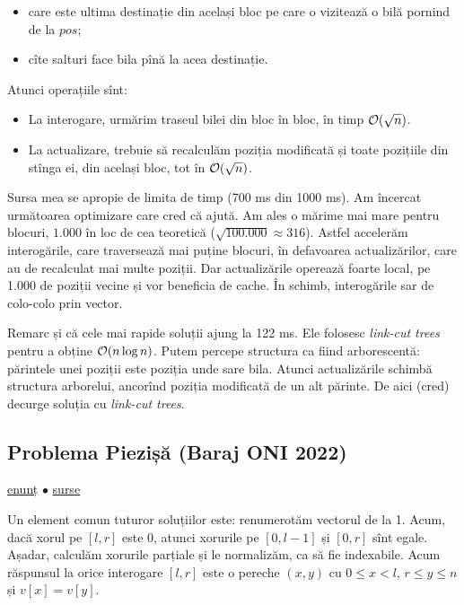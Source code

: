 \documentclass[../main.tex]{subfiles}
\begin{document}
\begin{itemize}
  \item care este ultima destinație din același bloc pe care o vizitează o bilă pornind de la $pos$;
  \item cîte salturi face bila pînă la acea destinație.
\end{itemize}

Atunci operațiile sînt:

\begin{itemize}
  \item La interogare, urmărim traseul bilei din bloc în bloc, în timp $\mathcal{O}(\sqrt{n})$.

  \item La actualizare, trebuie să recalculăm poziția modificată și toate pozițiile din stînga ei, din același bloc, tot în $\mathcal{O}(\sqrt{n})$.
\end{itemize}

Sursa mea se apropie de limita de timp (700 ms din 1000 ms). Am încercat următoarea optimizare care cred că ajută. Am ales o mărime mai mare pentru blocuri, $1.000$ în loc de cea teoretică ($\sqrt{100.000} \approx 316$). Astfel accelerăm interogările, care traversează mai puține blocuri, în defavoarea actualizărilor, care au de recalculat mai multe poziții. Dar actualizările operează foarte local, pe 1.000 de poziții vecine și vor beneficia de cache. În schimb, interogările sar de colo-colo prin vector.

Remarc și că cele mai rapide soluții ajung la 122 ms. Ele folosesc \textit{link-cut trees} pentru a obține $\mathcal{O}(n \log n)$. Putem percepe structura ca fiind arborescentă: părintele unei poziții este poziția unde sare bila. Atunci actualizările schimbă structura arborelui, ancorînd poziția modificată de un alt părinte. De aici (cred) decurge soluția cu \textit{link-cut trees}.

\subsection{Problema Piezișă (Baraj ONI 2022)}
\label{problem:piezișă}

\href{https://kilonova.ro/problems/142}{enunț}
$\bullet$
\hyperref[code:piezișă]{surse}

Un element comun tuturor soluțiilor este: renumerotăm vectorul de la 1. Acum, dacă xorul pe $[l,r]$ este 0, atunci xorurile pe $[0, l-1]$ și $[0, r]$ sînt egale. Așadar, calculăm xorurile parțiale și le normalizăm, ca să fie indexabile. Acum răspunsul la orice interogare $[l,r]$ este o pereche $(x,y)$ cu $0 \leq x < l$, $r \leq y \leq n$ și $v[x] = v[y]$.
\end{document}
